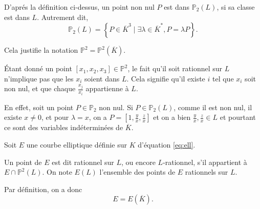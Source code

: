 D'aprés la définition ci-dessus, un point non nul $P$ est dans $\mathbb{P}_{2}(L)$, si sa classe est dans $L$. Autrement
dit, 
\[
\mathbb{P}_{2}(L)=\left\{ P \in \overline{K}^{3} \mid \exists \lambda \in \overline{K}^{*}, P =
\lambda P\right\} 
.\] 

Cela justifie la notation $\mathbb{P}^2 = \mathbb{P}^2(\overline{K})$.

\begin{remarque}
    Étant donné un point $[x_1,x_2,x_3] \in \mathbb{P}^2$, le fait qu'il soit rationnel sur $L$ n'implique pas que les $x_{i}$ soient dans $L$. Cela signifie qu'il existe $i$ tel que $x_{i}$ soit non nul, et que chaque $\frac{x_{j}}{x_{i}}$ appartienne à $L$.

    En effet, soit un point $P \in \mathbb{P}_{2}$ non nul. Si $P \in \mathbb{P}_{2}(L)$,
    comme il est non nul, il existe $x \neq 0$, et pour $\lambda = x$, on a $P =
    [1,\frac{y}{x},\frac{z}{x}]$ et on a bien $\frac{y}{x},\frac{z}{x} \in L$ et pourtant ce
    sont des variables indéterminées de $\overline{K}$.
\end{remarque}

Soit $E$ une courbe elliptique définie sur $K$ d'équation \eqref{eq:ell}.

\begin{definition}
    Un point de $E$ est dit rationnel sur $L$, ou encore $L$-rationnel, s'il appartient à $E \cap \mathbb{P}^2(L)$. On note $E(L)$ l'ensemble des points de $E$ rationnels sur $L$.
\end{definition}

Par définition, on a donc
\[
E = E(\overline{K})
.\] 



